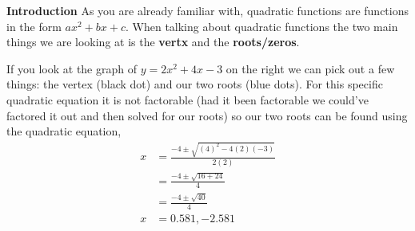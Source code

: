 \documentclass[addpoints]{exam}
\begin{document}
  \begin{tcolorbox}[breakable, title=QUADRATIC FUNCTIONS, colframe=black, sharp corners, colback=white, colbacktitle=white, coltitle=black]
    \Large \textbf{Introduction}
    \newline \normalsize
    As you are already familiar with, quadratic functions are functions in the form $ax^2+bx+c$. 
    When talking about quadratic functions the two main things we are looking at is the \textbf{vertx} and the \textbf{roots/zeros}.

    \vspace{0.3in}

    \begin{minipage}{0.45\linewidth}
    \end{minipage}
    \hfill 
    \begin{minipage}{0.45\linewidth}
      If you look at the graph of $y=2x^2 + 4x - 3$ on the right we can pick out a few things: the vertex (black dot) and our two roots (blue dots). For this specific quadratic equation it is not factorable (had it been factorable we could've factored it out and then solved for our roots) so our two roots can be found using the quadratic equation, 
      \begin{align*}
         x &= \frac{-4 \pm \sqrt{\left(4\right)^2 - 4\left(2\right)\left(-3\right)}}{2\left(2\right)} \\ 
        &= \frac{-4 \pm \sqrt{16 + 24}}{4} \\ 
        &= \frac{-4 \pm \sqrt{40}}{4} \\ 
        x &= 0.581, -2.581
      \end{align*}
    \end{minipage}


\end{tcolorbox}
\end{document}
